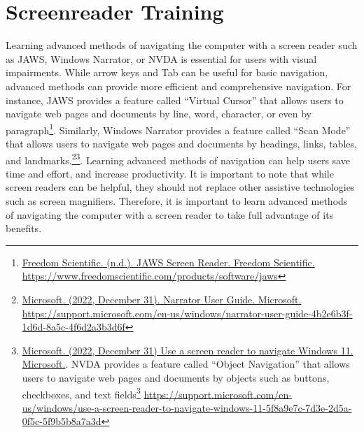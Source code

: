 \pagebreak\hypertarget{appx7}{}\section[Screenreader Training]{Screenreader Training}\label{appx7}
Learning advanced methods of navigating the computer with a screen reader such as JAWS, Windows Narrator, or NVDA is essential for users with visual impairments. While arrow keys and Tab can be useful for basic navigation, advanced methods can provide more efficient and comprehensive navigation. For instance, JAWS provides a feature called “Virtual Cursor” that allows users to navigate web pages and documents by line, word, character, or even by paragraph\footnote{\raggedright \href{https://www.freedomscientific.com/products/software/jaws}{Freedom Scientific. (n.d.). JAWS Screen Reader. Freedom Scientific.} \break\url{https://www.freedomscientific.com/products/software/jaws}}. Similarly, Windows Narrator provides a feature called “Scan Mode” that allows users to navigate web pages and documents by headings, links, tables, and landmarks.\footnote{\raggedright \href{https://support.microsoft.com/en-us/windows/narrator-user-guide-4b2e6b3f-1d6d-8a5c-4f6d2a3b3d6f}{Microsoft. (2022, December 31). Narrator User Guide. Microsoft. } \break\url{https://support.microsoft.com/en-us/windows/narrator-user-guide-4b2e6b3f-1d6d-8a5c-4f6d2a3b3d6f}}\fnsep\footnote{\raggedright \href{https://support.microsoft.com/en-us/windows/use-a-screen-reader-to-navigate-windows-11-5f8a9e7c-7d3e-2d5a-0f5c-5f9b5b8a7a3d}{Microsoft. (2022, December 31) Use a screen reader to navigate Windows 11. Microsoft.}. NVDA provides a feature called “Object Navigation” that allows users to navigate web pages and documents by objects such as buttons, checkboxes, and text fields\footnote{\raggedright \href{https://www.nvaccess.org/files/nvda/documentation/userGuide.html#toc3.1}{NV Access. (2022, December 31). NVDA User Guide. NV Access. } \break\url{https://www.nvaccess.org/files/nvda/documentation/userGuide.html#toc3.1}}  \break\url{https://support.microsoft.com/en-us/windows/use-a-screen-reader-to-navigate-windows-11-5f8a9e7c-7d3e-2d5a-0f5c-5f9b5b8a7a3d}}. Learning advanced methods of navigation can help users save time and effort, and increase productivity. It is important to note that while screen readers can be helpful, they should not replace other assistive technologies such as screen magnifiers. Therefore, it is important to learn advanced methods of navigating the computer with a screen reader to take full advantage of its benefits.
